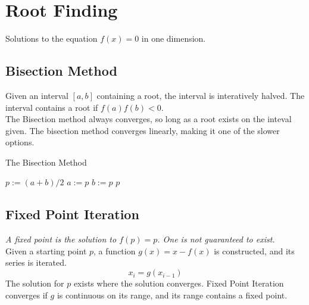 \documentclass[12pt]{article}
\numberwithin{equation}{subsection}
\begin{document}
    \section{Root Finding}

        Solutions to the equation $f(x) = 0$ in one dimension.

        \subsection{Bisection Method}

            Given an interval $[a, b]$ containing a root, the interval is
            interatively halved. The interval contains a root if $f(a)f(b)<0$.\\

            The Bisection method always converges, so long as a root exists
            on the inteval given. The bisection method converges linearly,
            making it one of the slower options.

            \begin{center}
            \begin{algorithm}[H]
                \caption{The Bisection Method}
                \begin{algorithmic}[1]
                        \State $p := (a + b) / 2$
                            \State $a := p$
                        \Else
                            \State $b := p$
                        \EndIf
                    \EndWhile
                    \State \Return $p$
                    \EndProcedure
                \end{algorithmic}
            \end{algorithm}
            \end{center}

        \subsection{Fixed Point Iteration}

            \textit{A fixed point is the solution to $f(p) = p$. One is not guaranteed
            to exist.}\\

            Given a starting point $p$, a function $g(x) = x - f(x)$ is
            constructed, and its series is iterated.
            $$x_{i} = g(x_{i-1})$$
            The solution for $p$ exists where the solution converges. Fixed
            Point Iteration converges if $g$ is continuous on its range, and
            its range contains a fixed point.
\end{document}
